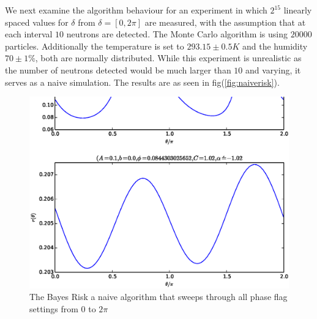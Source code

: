 We next examine the algorithm behaviour for an experiment in which $2^15$ linearly spaced values for $\delta$ from $\delta=[0,2\pi]$ are measured, with the assumption that at each interval $10$ neutrons are detected. The Monte Carlo algorithm is using $20000$ particles. Additionally the temperature is set to $293.15\pm0.5K$ and the humidity $70\pm1\%$, both are normally distributed. While this experiment is unrealistic as the number of neutrons detected would be much larger than $10$ and varying, it serves as a naive simulation. The results are as seen in fig(\ref{fig:naiverisk}). 
\begin{figure}[ht!]
\centering
\includegraphics[scale=1.0]{Figures/risks1.eps}
\caption{The Bayes Risk a naive algorithm that sweeps through all phase flag settings from $0$ to $2\pi$}
\label{fig:naiverisks}
\end{figure}


